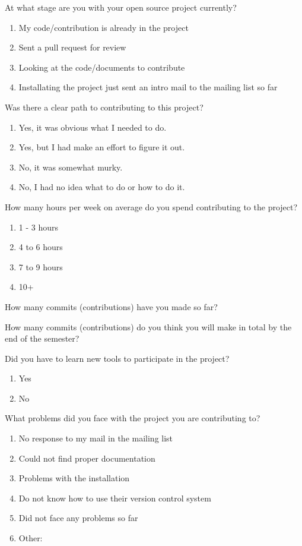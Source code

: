 \begin{table}
At what stage are you with your open source project currently?
\begin{enumerate}
\item My code/contribution is already in the project
\item Sent a pull request for review
\item Looking at the code/documents to contribute
\item Installating the project just sent an intro mail to the mailing list so far
\end{enumerate}

Was there a clear path to contributing to this project?
\begin{enumerate}
\item Yes, it was obvious what I needed to do.
\item Yes, but I had make an effort to figure it out.
\item No, it was somewhat murky.
\item No, I had no idea what to do or how to do it.
\end{enumerate}

How many hours per week on average do you spend contributing to the project?
\begin{enumerate}
\item 1 - 3 hours
\item 4 to 6 hours
\item 7 to 9 hours
\item 10+
\end{enumerate}

How many commits (contributions) have you made so far?

How many commits (contributions) do you think you will make in total by the end of the semester?

Did you have to learn new tools to participate in the project?
\begin{enumerate}
\item Yes
\item No
\end{enumerate}

What problems did you face with the project you are contributing to?
\begin{enumerate}
\item No response to my mail in the mailing list
\item Could not find proper documentation
\item Problems with the installation
\item Do not know how to use their version control system
\item Did not face any problems so far
\item Other:
\end{enumerate}


\end{table}
